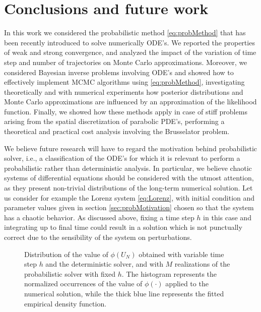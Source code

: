 \section{Conclusions and future work}

In this work we considered the probabilistic method \eqref{eq:probMethod} that has been recently introduced to solve numerically ODE's. We reported the properties of weak and strong convergence, and analyzed the impact of the variation of time step and number of trajectories on Monte Carlo approximations. Moreover, we considered Bayesian inverse problems involving ODE's and showed how to effectively implement MCMC algorithms using \eqref{eq:probMethod}, investigating theoretically and with numerical experiments how posterior distributions and Monte Carlo approximations are influenced by an approximation of the likelihood function. Finally, we showed how these methods apply in case of stiff problems arising from the spatial discretization of parabolic PDE's, performing a theoretical and practical cost analysis involving the Brusselator problem.

We believe future research will have to regard the motivation behind probabilistic solver, i.e., a classification of the ODE's for which it is relevant to perform a probabilistic rather than deterministic analysis. In particular, we believe chaotic systems of differential equations should be considered with the utmost attention, as they present non-trivial distributions of the long-term numerical solution. Let us consider for example the Lorenz system \eqref{eq:Lorenz}, with initial condition and parameter values given in section \ref{sec:probMotivation} chosen so that the system has a chaotic behavior. As discussed above, fixing a time step $h$ in this case and integrating up to final time could result in a solution which is not punctually correct due to the sensibility of the system on perturbations. 

\begin{figure}[t]
	\begin{subfigure}{0.49\linewidth}
		\centering
		\resizebox{1.0\linewidth}{!}{}
	\end{subfigure}
	\begin{subfigure}{0.49\linewidth}
		\centering
		\resizebox{1.0\linewidth}{!}{}
	\end{subfigure}
	\caption{Distribution of the value of $\phi(U_N)$ obtained with variable time step $h$ and the deterministic solver, and with $M$ realizations of the probabilistic solver with fixed $h$. The histogram represents the normalized occurrences of the value of $\phi(\cdot)$ applied to the numerical solution, while the thick blue line represents the fitted empirical density function.}
	\label{fig:densities}
\end{figure}

